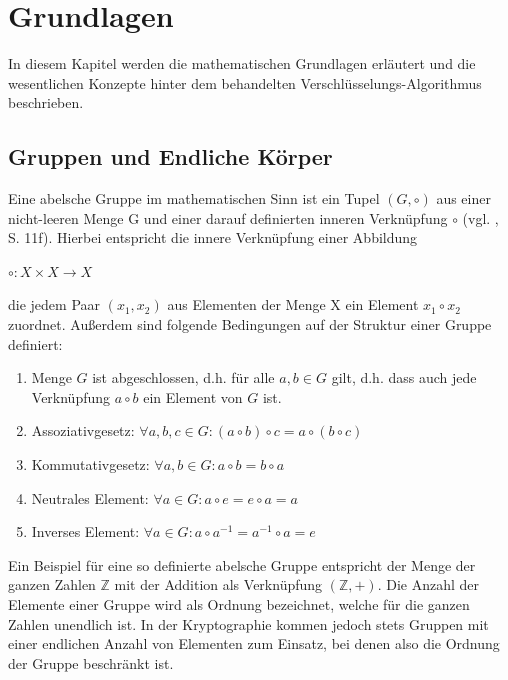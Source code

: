 
\chapter{Grundlagen}

In diesem Kapitel werden die mathematischen Grundlagen erläutert und die wesentlichen Konzepte hinter dem behandelten Verschlüsselungs-Algorithmus beschrieben. \\

\section{Gruppen und Endliche Körper}

Eine abelsche Gruppe im mathematischen Sinn ist ein Tupel $(G,\circ)$ aus einer nicht-leeren Menge G und einer darauf definierten inneren Verknüpfung $\circ$ (vgl. \cite{puttmann}, S. 11f). Hierbei entspricht die innere Verknüpfung einer Abbildung 
\begin{center}
$ \circ: X \times X \to X $
\end{center}
die jedem Paar $(x_1,x_2)$ aus Elementen der Menge X ein Element $x_1 \circ x_2$ zuordnet. Außerdem sind folgende Bedingungen auf der Struktur einer Gruppe definiert: \\

\begin{enumerate}
  \item Menge $G$ ist abgeschlossen, d.h. für alle $a,b \in G$ gilt, d.h. dass auch jede Verknüpfung $a \circ b$ ein Element von $G$ ist. 
  \item Assoziativgesetz: $ \forall a,b,c \in G: (a \circ b) \circ c = a \circ (b \circ c) $
  \item Kommutativgesetz: $ \forall a,b \in G: a \circ b = b \circ a $
  \item Neutrales Element: $ \forall a \in G: a \circ e = e \circ a = a$
  \item Inverses Element: $ \forall a \in G: a \circ a^{-1} = a^{-1} \circ a = e$\\
\end{enumerate}

Ein Beispiel für eine so definierte abelsche Gruppe entspricht der Menge der ganzen Zahlen $\mathbb{Z}$ mit der Addition als Verknüpfung $(\mathbb{Z},+)$. Die Anzahl der Elemente einer Gruppe wird als Ordnung bezeichnet, welche für die ganzen Zahlen unendlich ist. In der Kryptographie kommen jedoch stets Gruppen mit einer endlichen Anzahl von Elementen zum Einsatz, bei denen also die Ordnung der Gruppe beschränkt ist. \\

